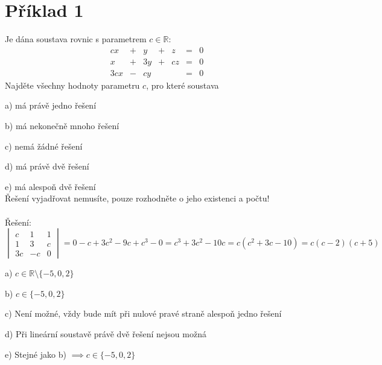 \section*{Příklad 1}
Je dána soustava rovnic s parametrem $c \in \mathbb{R}$:
$$
  \begin{matrix}
    cx  & + & y  & + & z  & = & 0 \\
    x   & + & 3y & + & cz & = & 0 \\
    3cx & - & cy &   &    & = & 0
  \end{matrix}
$$
Najděte všechny hodnoty parametru $c$, pro které soustava

a) má právě jedno řešení

b) má nekonečně mnoho řešení

c) nemá žádné řešení

d) má právě dvě řešení

e) má alespoň dvě řešení \\
Řešení vyjadřovat nemusíte, pouze rozhodněte o jeho existenci a počtu!\\\\
Řešení:
$$
  \begin{vmatrix}
    c  & 1  & 1 \\
    1  & 3  & c \\
    3c & -c & 0
  \end{vmatrix}
  = 0 - c + 3c^2 - 9c + c^3 - 0 = c^3 + 3c^2 - 10c
  = c \left(c^2 + 3c - 10\right)
  = c (c - 2)(c + 5)
$$

a) $ c \in \mathbb{R} \setminus \{-5, 0, 2\} $

b) $ c \in  \{-5, 0, 2\} $

c) Není možné, vždy bude mít při nulové pravé straně alespoň jedno řešení

d) Při lineární soustavě právě dvě řešení nejsou možná

e) Stejné jako b) $ \implies c \in  \{-5, 0, 2\} $
